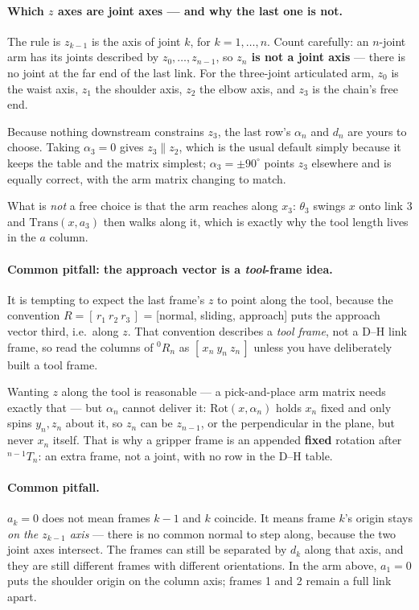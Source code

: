 \documentclass[11pt,a4paper]{article}
\begin{document}
\paragraph{Which $z$ axes are joint axes --- and why the last one is not.}
The rule is $z_{k-1}$ is the axis of joint $k$, for $k=1,\ldots,n$. Count carefully: an $n$-joint arm
has its joints described by $z_0,\ldots,z_{n-1}$, so \textbf{$z_n$ is not a joint axis} --- there is no
joint at the far end of the last link. For the three-joint articulated arm, $z_0$ is the waist axis,
$z_1$ the shoulder axis, $z_2$ the elbow axis, and $z_3$ is the chain's free end.

Because nothing downstream constrains $z_3$, the last row's $\alpha_n$ and $d_n$ are yours to choose.
Taking $\alpha_3=0$ gives $z_3\parallel z_2$, which is the usual default simply because it keeps the
table and the matrix simplest; $\alpha_3=\pm90^\circ$ points $z_3$ elsewhere and is equally correct,
with the arm matrix changing to match.

What is \emph{not} a free choice is that the arm reaches along $x_3$: $\theta_3$ swings $x$ onto
link 3 and $\mathrm{Trans}(x,a_3)$ then walks along it, which is exactly why the tool length lives in
the $a$ column.

\paragraph{Common pitfall: the approach vector is a \emph{tool}-frame idea.}
It is tempting to expect the last frame's $z$ to point along the tool, because the convention
$R=[\,r_1\ r_2\ r_3\,]$ = [normal, sliding, approach] puts the approach vector third, i.e.\ along
$z$. That convention describes a \emph{tool frame}, not a D--H link frame, so read the columns of
${}^0R_n$ as $[\,x_n\ y_n\ z_n\,]$ unless you have deliberately built a tool frame.

Wanting $z$ along the tool is reasonable --- a pick-and-place arm matrix needs exactly that --- but
$\alpha_n$ cannot deliver it: $\mathrm{Rot}(x,\alpha_n)$ holds $x_n$ fixed and only spins $y_n,z_n$
about it, so $z_n$ can be $z_{n-1}$, or the perpendicular in the plane, but never $x_n$ itself. That is
why a gripper frame is an appended \textbf{fixed} rotation after ${}^{n-1}T_n$: an extra frame, not a
joint, with no row in the D--H table.

\paragraph{Common pitfall.}
$a_k=0$ does not mean frames $k-1$ and $k$ coincide. It means frame $k$'s origin stays
\emph{on the $z_{k-1}$ axis} --- there is no common normal to step along, because the two joint axes
intersect. The frames can still be separated by $d_k$ along that axis, and they are still different
frames with different orientations. In the arm above, $a_1=0$ puts the shoulder origin on the column
axis; frames 1 and 2 remain a full link apart.
\end{document}

